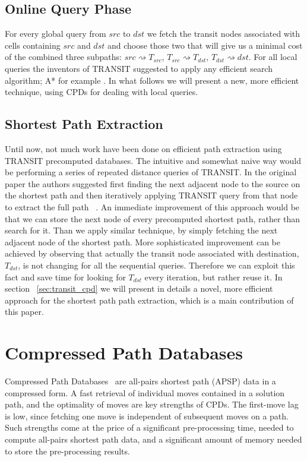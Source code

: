 \documentclass[runningheads,a4paper]{llncs}
\begin{document}
\subsection{Online Query Phase}\label{sub:query}
For every global query from $src$ to $dst$ we fetch the transit nodes associated with cells containing
$src$ and $dst$ and choose those two that will give us a minimal cost of the combined three subpaths:
$src \rightsquigarrow T_{src}$, $T_{src} \rightsquigarrow T_{dst}$, $T_{dst} \rightsquigarrow dst$.
For all local queries the inventors of TRANSIT suggested to apply any efficient search algorithm; A* for example \cite{bast06}.
In what follows we will present a new, more efficient technique, using CPDs for dealing with local queries.

\subsection{Shortest Path Extraction}\label{sub:path_extraction}
Until now, not much work have been done on efficient path extraction using TRANSIT precomputed databases.
The intuitive and somewhat naive way would be performing a series of repeated distance queries of TRANSIT.
In the original paper the authors suggested first finding the next adjacent node to the source on the shortest path
and then iteratively applying TRANSIT query from that node to extract the full path ~\cite{bast06}.
An immediate improvement of this approach would be that we can store the next node of every precomputed
shortest path, rather than search for it.  Than we apply similar technique, by simply fetching the next adjacent node of the shortest path.
More sophisticated improvement can be achieved by observing that actually the transit node associated with destination, $T_{dst}$,
is not changing for all the sequential queries. Therefore we can exploit this fact and save time for looking for $T_{dst}$ every iteration, but 
rather reuse it.
In section ~\ref{sec:transit_cpd} we will present in details a novel, more efficient approach for the shortest path path extraction,
which is a main contribution of this paper.

\section{Compressed Path Databases}

Compressed Path Databases~\cite{botea11,DBLP:conf/socs/Botea12} are
all-pairs shortest path (APSP) data in a compressed form.
A fast retrieval of individual moves contained in a solution path, and the
optimality of moves are key strengths of CPDs. The {first-move
lag} is low, since fetching one move is independent of subsequent moves on a
path. Such strengths come at the price of a significant pre-processing time,
needed to compute all-pairs shortest path data, and a significant amount of
memory needed to store the pre-processing results.
\end{document}
